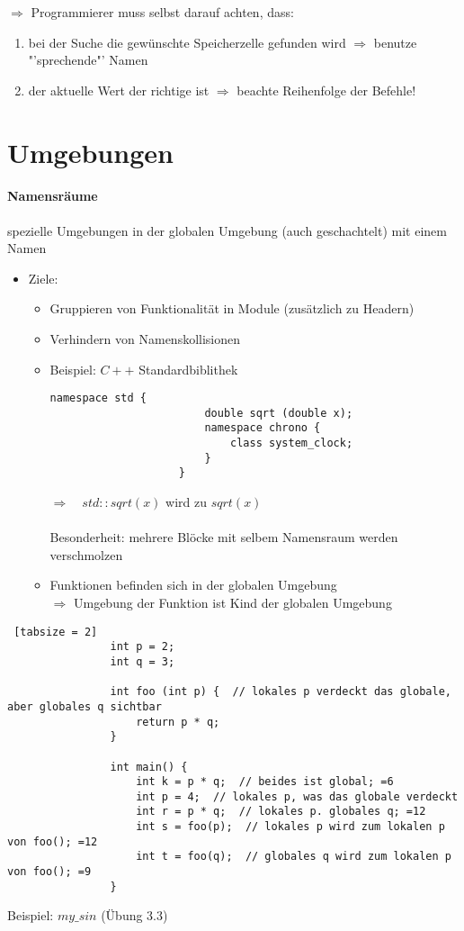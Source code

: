 \documentclass{article}
\begin{document}
	 $\Rightarrow$ Programmierer muss selbst darauf achten, dass:
	 \begin{enumerate}
	 	\item bei der Suche die gewünschte Speicherzelle gefunden wird $\Rightarrow$ benutze "'sprechende"' Namen
	 	\item der aktuelle Wert der richtige ist $\Rightarrow$ beachte Reihenfolge der Befehle!
	 \end{enumerate}
	 
	 \section{Umgebungen}
	 \paragraph{Namensräume}
	 
		 spezielle Umgebungen in der globalen Umgebung (auch geschachtelt) mit einem Namen
	 	\begin{itemize}
	 		\item Ziele:
	 		\begin{itemize}
	 			\item Gruppieren von Funktionalität in Module (zusätzlich zu Headern)
	 			\item Verhindern von Namenskollisionen
	 			\item Beispiel: $C++$ Standardbiblithek
	 			\begin{lstlisting}[tabsize = 2]
	 				namespace std {
		 				double sqrt (double x);
		 				namespace chrono {
			 				class system_clock;
		 				}
	 				}
	 			\end{lstlisting}
	 			$\Rightarrow \quad std::sqrt(x)$ wird zu $sqrt(x)$ \\ \\
	 			Besonderheit: mehrere Blöcke mit selbem Namensraum werden verschmolzen
	 			\item Funktionen befinden sich in der globalen Umgebung \\
	 			$\Rightarrow$ Umgebung der Funktion ist Kind der globalen Umgebung
	 		\end{itemize}
	 		\end{itemize}
	 		\begin{lstlisting} [tabsize = 2]
	 			int p = 2;
	 			int q = 3;
	 			
	 			int foo (int p) {  // lokales p verdeckt das globale, aber globales q sichtbar
		 			return p * q;
	 			}
	 			
	 			int main() {
		 			int k = p * q;  // beides ist global; =6
		 			int p = 4;  // lokales p, was das globale verdeckt
		 			int r = p * q;  // lokales p. globales q; =12
		 			int s = foo(p);  // lokales p wird zum lokalen p von foo(); =12
		 			int t = foo(q);  // globales q wird zum lokalen p von foo(); =9
	 			}
	 		\end{lstlisting}
		 	 Beispiel: $\textit{my\_sin}$ (Übung 3.3)
\end{document}
